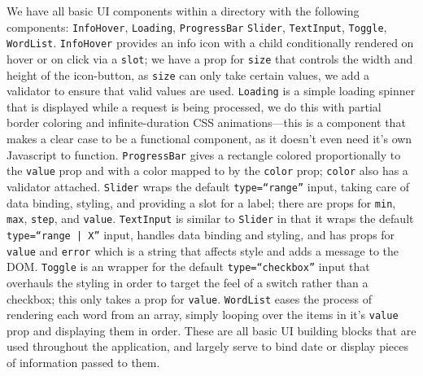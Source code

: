 \documentclass[11pt, twoside, reqno]{book}
\begin{document}
We have all basic UI components within a directory with the following components: \texttt{InfoHover}, \texttt{Loading}, \texttt{ProgressBar} \texttt{Slider}, \texttt{TextInput}, \texttt{Toggle}, \texttt{WordList}. \texttt{InfoHover} provides an info icon with a child conditionally rendered on hover or on click via a \texttt{slot}; we have a prop for \texttt{size} that controls the width and height of the icon-button, as \texttt{size} can only take certain values, we add a validator to ensure that valid values are used. \texttt{Loading} is a simple loading spinner that is displayed while a request is being processed, we do this with partial border coloring and infinite-duration CSS animations—this is a component that makes a clear case to be a functional component, as it doesn't even need it's own Javascript to function. \texttt{ProgressBar} gives a rectangle colored proportionally to the \texttt{value} prop and with a color mapped to by the \texttt{color} prop; \texttt{color} also has a validator attached. \texttt{Slider} wraps the default \texttt{type=``range''} input, taking care of data binding, styling, and providing a slot for a label; there are props for \texttt{min}, \texttt{max}, \texttt{step}, and \texttt{value}. \texttt{TextInput} is similar to \texttt{Slider} in that it wraps the default \texttt{type=``range | X''} input, handles data binding and styling, and has props for \texttt{value} and \texttt{error} which is a string that affects style and adds a message to the DOM. \texttt{Toggle} is an wrapper for the default \texttt{type=``checkbox''} input that overhauls the styling in order to target the feel of a switch rather than a checkbox; this only takes a prop for \texttt{value}. \texttt{WordList} eases the process of rendering each word from an array, simply looping over the items in it's \texttt{value} prop and displaying them in order. These are all basic UI building blocks that are used throughout the application, and largely serve to bind date or display pieces of information passed to them.
\end{document}
